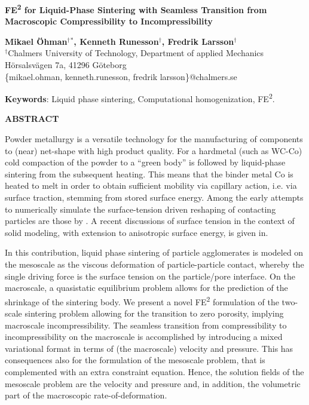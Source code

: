 \documentclass[11pt,a4paper]{article}
\begin{document}
\pagestyle{empty}

\begin{center}
%
%
{\fontsize{14}{20}\bfseries
FE\textsuperscript{2} for Liquid-Phase Sintering with Seamless Transition from Macroscopic Compressibility to Incompressibility
}
\end{center}

\begin{center}
\textbf{Mikael \"Ohman$^\dagger$$^\ast$, Kenneth Runesson$^\dagger$, Fredrik Larsson$^\dagger$}\\
\bigskip
$^\dagger${Chalmers University of Technology, Department of applied Mechanics}\\
H\"orsalsv\"agen 7a, 41296 G\"oteborg\\ \{mikael.ohman, kenneth.runesson, fredrik larsson\}@chalmers.se\\
\bigskip
\end{center}
%
%

{\bfseries Keywords}: Liquid phase sintering, Computational homogenization, FE\textsuperscript{2}.

\begin{center}
\textbf{ABSTRACT}\\[1mm]
\end{center}

Powder metallurgy is a versatile technology for the manufacturing of components to (near) net-shape with high product quality. For a hardmetal (such as WC-Co) cold compaction of the powder to a ``green body'' is followed by liquid-phase sintering from the subsequent heating.
This means that the binder metal Co is heated to melt in order to obtain sufficient mobility via capillary action, i.e. via surface traction, stemming from stored surface energy.
Among the early attempts to numerically simulate the surface-tension driven reshaping of contacting particles are those by \cite{JagDaw1988a}.
A recent discussions of surface tension in the context of solid modeling, with extension to anisotropic surface energy, is given in\cite{JavSte2009:2d}.

%
%
In this contribution, liquid phase sintering of particle agglomerates is modeled on the mesoscale as the viscous deformation of particle-particle contact, whereby the single driving force is the surface tension on the particle/pore interface.
On the macroscale, a quasistatic equilibrium problem allows for the prediction of the shrinkage of the sintering body. 
We present a novel FE\textsuperscript{2} formulation of the two-scale sintering problem allowing for the transition to zero porosity, implying macroscale incompressibility.
The seamless transition from compressibility to incompressibility on the macroscale is accomplished by introducing a mixed variational format in terms of (the macroscale) velocity and pressure.
This has consequences also for the formulation of the mesoscale problem, that is complemented with an extra constraint equation.
Hence, the solution fields of the mesoscale problem are the velocity and pressure and, in addition, 
the volumetric part of the macroscopic rate-of-deformation.
\end{document}
